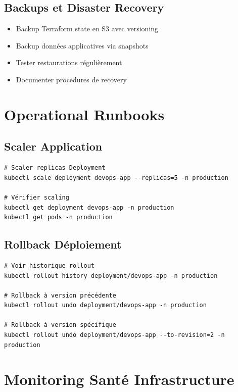 \documentclass[12pt,a4paper]{report}
\begin{document}
\subsection{Backups et Disaster Recovery}

\begin{itemize}
    \item Backup Terraform state en S3 avec versioning
    \item Backup données applicatives via snapshots
    \item Tester restaurations régulièrement
    \item Documenter procedures de recovery
\end{itemize}

\section{Operational Runbooks}

\subsection{Scaler Application}

\lstset{language=bash}
\begin{lstlisting}
# Scaler replicas Deployment
kubectl scale deployment devops-app --replicas=5 -n production

# Vérifier scaling
kubectl get deployment devops-app -n production
kubectl get pods -n production
\end{lstlisting}

\subsection{Rollback Déploiement}

\lstset{language=bash}
\begin{lstlisting}
# Voir historique rollout
kubectl rollout history deployment/devops-app -n production

# Rollback à version précédente
kubectl rollout undo deployment/devops-app -n production

# Rollback à version spécifique
kubectl rollout undo deployment/devops-app --to-revision=2 -n production
\end{lstlisting}

\section{Monitoring Santé Infrastructure}
\end{document}
